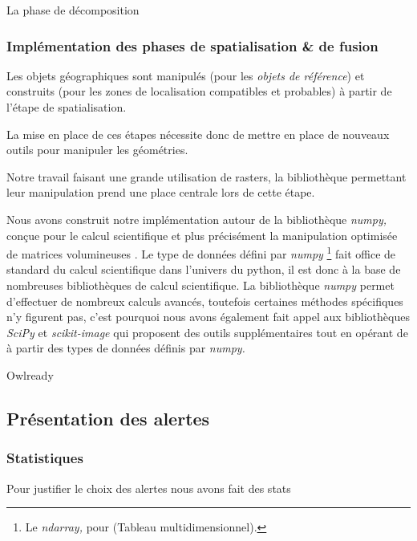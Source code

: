 La phase de décomposition


\subsubsection{Implémentation des phases de spatialisation \& de fusion}

Les objets géographiques sont manipulés (pour les \emph{objets de
  référence}) et construits (pour les zones de localisation
compatibles et probables) à partir de l'étape de spatialisation.

La mise en place de ces étapes nécessite donc de mettre en place de
nouveaux outils pour manipuler les géométries.

Notre travail faisant une grande utilisation de rasters, la
bibliothèque permettant leur manipulation prend une place centrale
lors de cette étape.

Nous avons construit notre implémentation autour de la bibliothèque
\emph{numpy,} conçue pour le calcul scientifique et plus précisément
la manipulation optimisée de matrices volumineuses
\autocite{vanderWalt2011}. Le type de données défini par \emph{numpy}
\footnote{Le \emph{ndarray,} pour
   (Tableau
  multidimensionnel).} fait office de standard du calcul scientifique
dans l'univers du python, il est donc à la base de nombreuses
bibliothèques de calcul scientifique.  La bibliothèque \emph{numpy}
permet d'effectuer de nombreux calculs avancés, toutefois certaines
méthodes spécifiques n'y figurent pas, c'est pourquoi nous avons
également fait appel aux bibliothèques \emph{SciPy} et
\emph{scikit-image} \autocite{vanderWalt2014,Virtanen2020} qui
proposent des outils supplémentaires tout en opérant de à partir des
types de données définis par \emph{numpy.}



Owlready \autocite{Lamy2017}





\subsection{Présentation des alertes}

\subsubsection{Statistiques}

Pour justifier le choix des alertes nous avons fait des stats 

